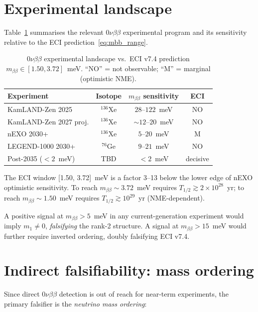 \documentclass[aps,prl,twocolumn,showpacs,superscriptaddress]{revtex4-2}
\newcommand{\mbb}{m_{\beta\beta}}
\begin{document}
\section{Experimental landscape}
\label{sec:landscape}

Table~\ref{tab:expt} summarises the relevant $0\nu\beta\beta$
experimental program and its sensitivity relative to the ECI
prediction~\eqref{eq:mbb_range}.

\begin{table}[h]
\centering
\caption{$0\nu\beta\beta$ experimental landscape vs.\ ECI v7.4
prediction $\mbb\in[1.50,3.72]$~meV.
``NO'' = not observable; ``M'' = marginal (optimistic NME).}
\label{tab:expt}
\begin{tabular}{lccc}
\toprule
Experiment & Isotope & $\mbb$ sensitivity & ECI \\
\midrule
KamLAND-Zen 2025~\cite{KLZ25}   & $^{136}$Xe & $28$--$122$~meV & NO \\
KamLAND-Zen 2027 proj.           & $^{136}$Xe & $\sim12$--$20$~meV & NO \\
nEXO 2030+~\cite{nEXO21}        & $^{136}$Xe & $5$--$20$~meV   & M \\
LEGEND-1000 2030+~\cite{LEG21}  & $^{76}$Ge  & $9$--$21$~meV   & NO \\
Post-2035 ($<2$~meV)            & TBD        & $<2$~meV         & decisive \\
\bottomrule
\end{tabular}
\end{table}

The ECI window [1.50, 3.72]~meV is a factor 3--13 below the
lower edge of nEXO optimistic sensitivity.  To reach $\mbb\sim3.72$~meV
requires $T_{1/2}\gtrsim 2\times10^{28}$~yr; to reach
$\mbb\sim1.50$~meV requires $T_{1/2}\gtrsim10^{29}$~yr (NME-dependent).

A positive signal at $\mbb > 5$~meV in any current-generation
experiment would imply $m_1\neq 0$, \emph{falsifying}
the rank-2 structure.  A signal at $\mbb > 15$~meV would further
require inverted ordering, doubly falsifying ECI v7.4.

\section{Indirect falsifiability: mass ordering}
\label{sec:falsify}

Since direct $0\nu\beta\beta$ detection is out of reach for
near-term experiments, the primary falsifier is the \emph{neutrino
mass ordering}:
\end{document}
